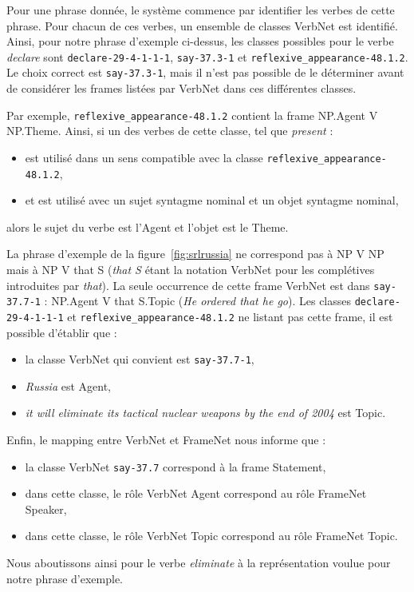 Pour une phrase donnée, le système commence par identifier les verbes de
cette phrase. Pour chacun de ces verbes, un ensemble de classes VerbNet est
identifié. Ainsi, pour notre phrase d'exemple ci-dessus, les classes possibles
pour le verbe \emph{declare} sont \texttt{declare-29-4-1-1-1},
\texttt{say-37.3-1} et \texttt{reflexive\_appearance-48.1.2}. Le choix correct
est \texttt{say-37.3-1}, mais il n'est pas possible de le déterminer avant de
considérer les frames listées par VerbNet dans ces différentes classes.

Par exemple, \texttt{reflexive\_appearance-48.1.2} contient la frame NP.Agent V
NP.Theme. Ainsi, si un des verbes de cette classe, tel que \emph{present} :
\begin{itemize}
    \item est utilisé dans un sens compatible avec la classe
        \texttt{reflexive\_appearance-48.1.2},
    \item et est utilisé avec un sujet syntagme nominal et un objet syntagme
        nominal,
\end{itemize}
alors le sujet du verbe est l'Agent et l'objet est le Theme.

La phrase d'exemple de la figure~\ref{fig:srlrussia} ne correspond pas à NP V
NP mais à NP V that S (\emph{that S} étant la notation VerbNet pour les
complétives introduites par \emph{that}). La seule occurrence de cette frame
VerbNet est dans \texttt{say-37.7-1} : NP.Agent V that S.Topic (\emph{He
ordered that he go}). Les classes \texttt{declare-29-4-1-1-1} et
\texttt{reflexive\_appearance-48.1.2} ne listant pas cette frame, il est
possible d'établir que :
\begin{itemize}
    \item la classe VerbNet qui convient est \texttt{say-37.7-1},
    \item \emph{Russia} est Agent,
    \item \emph{it will eliminate its tactical nuclear weapons by the end of 2004} est Topic.
\end{itemize}
        
Enfin, le mapping entre VerbNet et FrameNet nous informe que :
\begin{itemize}
    \item la classe VerbNet \texttt{say-37.7} correspond à la frame Statement,
    \item dans cette classe, le rôle VerbNet Agent correspond au rôle FrameNet Speaker,
    \item dans cette classe, le rôle VerbNet Topic correspond au rôle FrameNet Topic.
\end{itemize}
Nous aboutissons ainsi pour le verbe \emph{eliminate} à la représentation
voulue pour notre phrase d'exemple.

